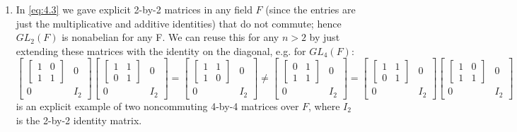\documentclass[]{article}
\begin{document}
\begin{enumerate}
\item In \eqref{eq:4.3} we gave explicit 2-by-2 matrices in any field $F$ (since the entries are just the multiplicative and additive identities) that do not commute; hence $GL_2(F)$ is nonabelian for any F. We can reuse this for any $n>2$ by just extending these matrices with the identity on the diagonal, e.g. for $GL_4(F)$:
\begin{equation}
\begin{bmatrix}\begin{bmatrix}1&0\\1&1\end{bmatrix}&0\\0&I_2\end{bmatrix} \begin{bmatrix}\begin{bmatrix}1&1\\0&1\end{bmatrix}&0\\0&I_2\end{bmatrix} = 
\begin{bmatrix}\begin{bmatrix}1&1\\1&0\end{bmatrix}&0\\0&I_2\end{bmatrix} \neq 
\begin{bmatrix}\begin{bmatrix}0&1\\1&1\end{bmatrix}&0\\0&I_2\end{bmatrix} =
\begin{bmatrix}\begin{bmatrix}1&1\\0&1\end{bmatrix}&0\\0&I_2\end{bmatrix}
\begin{bmatrix}\begin{bmatrix}1&0\\1&1\end{bmatrix}&0\\0&I_2\end{bmatrix}
\end{equation}
is an explicit example of two noncommuting 4-by-4 matrices over $F$, where $I_2$ is the 2-by-2 identity matrix.


\end{enumerate}
\end{document}
